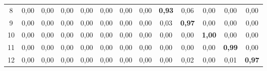 \begin{table}
\begin{center}
\begin{tabular}{|c|c|c|c|c|c|c|c|c|c|c|c|c|}
 8 & 0,00 & 0,00 & 0,00 & 0,00 & 0,00 & 0,00 & 0,00 & \textbf{0{,}93} & 0,06 & 0,00 & 0,00 & 0,00\\


 9 & 0,00 & 0,00 & 0,00 & 0,00 & 0,00 & 0,00 & 0,00 & 0,03 & \textbf{0{,}97} & 0,00 & 0,00 & 0,00\\


 10\hphantom{9} & 0,00 & 0,00 & 0,00 & 0,00 & 0,00 & 0,00 & 0,00 & 0,00 & 0,00 & \textbf{1{,}00} & 0,00 & 0,00\\ 


 11\hphantom{9} & 0,00 & 0,00 & 0,00 & 0,00 & 0,00 & 0,00 & 0,00 & 0,00 & 0,00 & 0,00 & \textbf{0{,}99} & 0,00\\


 12\hphantom{9} & 0,00 & 0,00 & 0,00 & 0,00 & 0,00 & 0,00 & 0,00 & 0,00 & 0,02 & 0,00 & 0,01 & 


 \textbf{0{,}97}\\


 \hline


\end{tabular}


\end{center}


\end{table}





